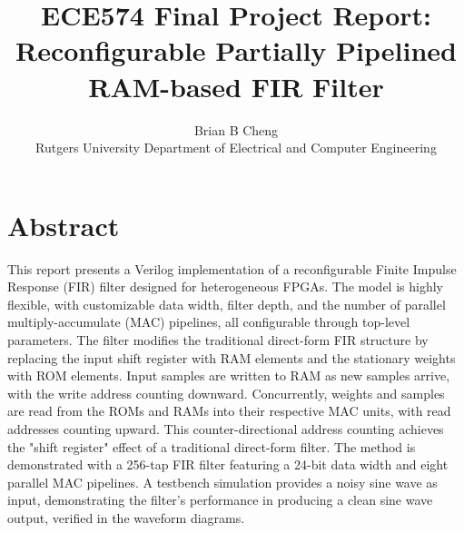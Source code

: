 \documentclass{article}
\begin{document}
\title{ECE574 Final Project Report: \\ Reconfigurable Partially Pipelined RAM-based FIR Filter}
\author{Brian B Cheng \\ Rutgers University Department of Electrical and Computer Engineering}


\date{}
\maketitle


\section{Abstract}
    This report presents a Verilog implementation of a reconfigurable Finite Impulse Response (FIR) filter designed for heterogeneous FPGAs.
    The model is highly flexible, with customizable data width, filter depth, and the number of parallel multiply-accumulate (MAC) pipelines, all configurable through top-level parameters.
    The filter modifies the traditional direct-form FIR structure by replacing the input shift register with RAM elements and the stationary weights with ROM elements. 
    Input samples are written to RAM as new samples arrive, with the write address counting downward.
    Concurrently, weights and samples are read from the ROMs and RAMs into their respective MAC units, with read addresses counting upward. 
    This counter-directional address counting achieves the "shift register" effect of a traditional direct-form filter.
    The method is demonstrated with a 256-tap FIR filter featuring a 24-bit data width and eight parallel MAC pipelines. 
    A testbench simulation provides a noisy sine wave as input, demonstrating the filter's performance in producing a clean sine wave output, verified in the waveform diagrams.
\end{document}
